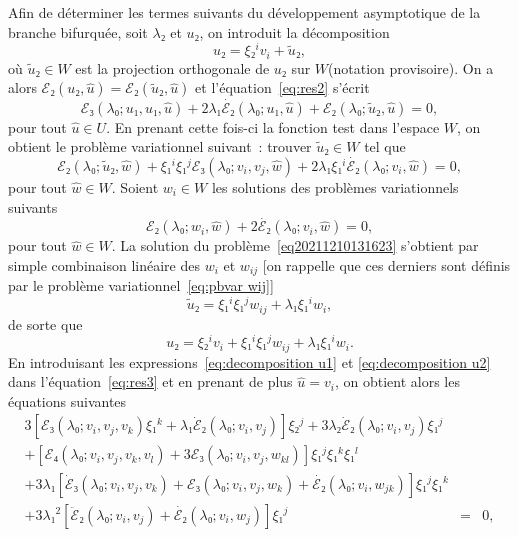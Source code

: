 \documentclass[12pt, final]{amsart}
\theoremstyle{definition}
\begin{document}
Afin de déterminer les termes suivants du développement asymptotique
de la branche bifurquée, soit $λ₂$ et $u₂$, on introduit la
décomposition
\begin{equation}
  u₂ = ξ₂^i v_i + \tilde{u}₂,
\end{equation}
où $\tilde{u}₂∈W$ est la projection orthogonale de $u₂$ sur
$W$(notation provisoire). On a alors $ℰ₂ (u₂, \hat{u})
=ℰ₂ (\tilde{u}₂, \hat{u})$ et l'équation~\eqref{eq:res2}
s'écrit
\begin{equation}
  ℰ₃ (λ₀ ; u₁, u₁, \hat{u}) + 2 λ₁
  \dot{ℰ₂} (λ₀ ; u₁, \hat{u}) +ℰ₂ (λ₀ ;
  \tilde{u}₂, \hat{u}) = 0,
\end{equation}
pour tout $\hat{u}∈U$. En prenant cette fois-ci la fonction test dans
l'espace $W$, on obtient le problème variationnel suivant~: trouver
$\tilde{u}₂∈W$ tel que
\begin{equation}
  \label{eq20211210131623} ℰ₂ (λ₀ ; {\tilde{u}₂} , \hat{w})
  + ξ₁^i ξ₁^j ℰ₃ (λ₀ ; v_i, v_j, \hat{w}) + 2
  λ₁ ξ₁^i  \dot{ℰ₂} (λ₀ ; v_i, \hat{w}) = 0,
\end{equation}
pour tout $\hat{w}∈W$. Soient $w_i∈W$ les solutions des problèmes
variationnels suivants
\begin{equation}
  \label{eq:pbvar wi} ℰ₂ (λ₀ ; w_i, \hat{w}) + 2
  \dot{ℰ₂} (λ₀ ; v_i, \hat{w}) = 0,
\end{equation}
pour tout $\hat{w}∈W$. La solution du
problème~\eqref{eq20211210131623} s'obtient par simple combinaison
linéaire des $w_i$ et $w_{ij}$ [on rappelle que ces derniers sont
définis par le problème variationnel~\eqref{eq:pbvar wij}]
\begin{equation}
  \tilde{u}₂ = ξ₁^i ξ₁^j w_{i  j} + λ₁ ξ₁^i w_i,
\end{equation}
de sorte que
\begin{equation}
  \label{eq:decomposition u2} u₂ = ξ₂^i v_i + ξ₁^i ξ₁^j w_{i
   j} + λ₁ ξ₁^i w_i .
\end{equation}
En introduisant les expressions~\eqref{eq:decomposition u1} et
\eqref{eq:decomposition u2} dans l'équation~\eqref{eq:res3} et en prenant
de plus $\hat{u} = v_i$, on obtient alors les équations suivantes
\begin{eqnarray}
  3 [ℰ₃ (λ₀ ; v_i, v_j, v_k) ξ₁^k + λ₁
  \dot{ℰ}₂ (λ₀ ; v_i, v_j)] ξ₂^j + 3 λ₂
  \dot{ℰ}₂ (λ₀ ; v_i, v_j) ξ₁^j &  &  \nonumber\\
  + [ℰ₄ (λ₀ ; v_i, v_j, v_k, v_l) + 3ℰ₃
  (λ₀ ; v_i, v_j, w_{k  l})] ξ₁^j ξ₁^k ξ₁^l &  &
  \nonumber\\
  + 3 λ₁  [\dot{ℰ}₃ (λ₀ ; v_i, v_j, v_k)
  +ℰ₃ (λ₀ ; v_i, v_j, w_k) + \dot{ℰ₂} (λ₀
  ; v_i, w_{j  k})] ξ₁^j ξ₁^k &  &  \nonumber\\
  + 3 λ₁^2  [\ddot{ℰ}₂ (λ₀ ; v_i, v_j) +
  \dot{ℰ₂} (λ₀ ; v_i, w_j)] ξ₁^j & = & 0,
  \label{eq:bifurcation 2a}
\end{eqnarray}
\end{document}
